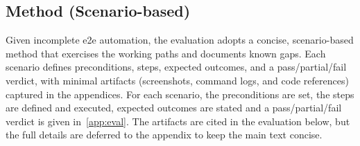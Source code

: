 \documentclass[11pt, a4paper, oneside, listof=totoc]{scrartcl}
\begin{document}
        \subsection{Method (Scenario-based)}\label{subsec:evalMethod}
            Given incomplete \gls{e2e} automation, the evaluation adopts a concise, scenario-based
            method that exercises the working paths and documents known gaps.
            Each scenario defines preconditions, steps, expected outcomes, and a pass/partial/fail
            verdict, with minimal artifacts (screenshots, command logs, and code references)
            captured in the appendices.
            For each scenario, the preconditions are set, the steps are defined and executed,
            expected outcomes are stated and a pass/partial/fail verdict is given
            in~\autoref{app:eval}.
            The artifacts are cited in the evaluation below, but the full details are deferred to
            the appendix to keep the main text concise.\\
\end{document}
